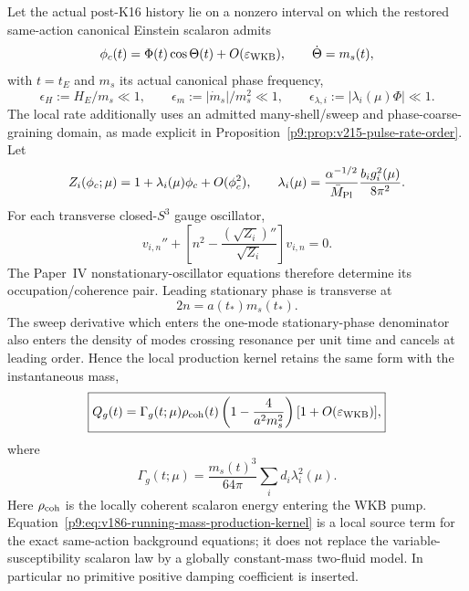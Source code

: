 \documentclass[12pt,a4paper]{article}
\begin{document}
\begin{theorem}
\label{p9:thm:v181-kin16-bogoliubov-backreaction}
Let the actual post-K16 history lie on a nonzero interval on which the restored
same-action canonical Einstein scalaron admits
\[
 \phi_c(t)=\Phi(t)\cos\Theta(t)+O(\varepsilon_{\rm WKB}),
 \qquad \dot\Theta=m_s(t),
\]
with $t=t_E$ and $m_s$ its actual canonical phase frequency,
\[
 \epsilon_H:=H_E/m_s\ll1,\qquad
 \epsilon_m:=|\dot m_s|/m_s^2\ll1,\qquad
 \epsilon_{\lambda,i}:=|\lambda_i(\mu)\Phi|\ll1.
\]
The local rate additionally uses an admitted many-shell/sweep and phase-coarse-graining domain, as made explicit in Proposition~\ref{p9:prop:v215-pulse-rate-order}. Let
\[
 Z_i(\phi_c;\mu)=1+\lambda_i(\mu)\phi_c+O(\phi_c^2),\qquad
 \lambda_i(\mu)=\frac{\alpha^{-1/2}}{\bar M_{\rm Pl}}
 \frac{b_i g_i^2(\mu)}{8\pi^2}.
\]
For each transverse closed-$S^3$ gauge oscillator,
\[
 v_{i,n}''+\left[n^2-\frac{(\sqrt{Z_i})''}{\sqrt{Z_i}}\right]v_{i,n}=0.
\]
The Paper~IV nonstationary-oscillator equations therefore determine its
occupation/coherence pair.  Leading stationary phase is transverse at
\begin{equation}
\label{p9:eq:v186-running-mass-resonance}
 \boxed{2n=a(t_*)m_s(t_*).}
\end{equation}
The sweep derivative which enters the one-mode stationary-phase denominator
also enters the density of modes crossing resonance per unit time and cancels
at leading order.  Hence the local production kernel retains the same form
with the instantaneous mass,
\begin{equation}
\label{p9:eq:v186-running-mass-production-kernel}
 \boxed{
 Q_g(t)=\Gamma_g(t;\mu)\rho_{\rm coh}(t)
 \left(1-\frac4{a^2m_s^2}\right)
 [1+O(\varepsilon_{\rm WKB})],}
\end{equation}
where
\begin{equation}
\label{p9:eq:v186-running-mass-gamma}
 \boxed{
 \Gamma_g(t;\mu)=\frac{m_s(t)^3}{64\pi}
 \sum_i d_i\lambda_i^2(\mu).}
\end{equation}
Here $\rho_{\rm coh}$ is the locally coherent scalaron energy entering the
WKB pump.  Equation~\eqref{p9:eq:v186-running-mass-production-kernel} is a
local source term for the exact same-action background equations; it does not
replace the variable-susceptibility scalaron law by a globally constant-mass
two-fluid model.  In particular no primitive positive damping coefficient is
inserted.


\end{theorem}
\end{document}
